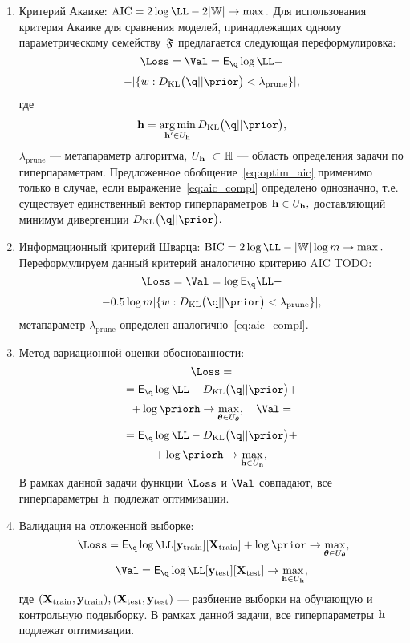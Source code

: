 \documentclass[11pt, a5paper]{dissert}
\theoremstyle{definition}
\DeclareMathOperator*{\argmin}{arg\,min}
\begin{document}
{\begin{enumerate}
\item Критерий Акаике:
$
   \text{AIC} =  2\log \LL - 2|\Wb| \to \max.
$
Для использования критерия Акаике для сравнения моделей, принадлежащих одному параметрическому семейству~$\mathfrak{F}$ предлагается следующая переформулировка:
\begin{equation}
\label{eq:optim_aic}
    \Loss = \Val = \E_{\q}\log \LL - 
\end{equation}
\[
 - |\{w: \KL{\q}{\prior}<\lambda_\text{prune}\}|,
\]
где 
\begin{equation}\label{eq:aic_compl}\h=\argmin_{\h' \in \Uh} \KL{\q}{\prior},\end{equation} $\lambda_{\text{prune}}$ --- метапараметр алгоритма, $\Uh  \subset \Hb$ --- область определения задачи по гиперпараметрам. Предложенное обобщение~\eqref{eq:optim_aic} применимо только в случае, если выражение~\eqref{eq:aic_compl} определено однозначно, т.е. существует единственный вектор гиперпараметров  $\mathbf{h} \in U_{\mathbf{h}},$ доставляющий минимум дивергенции $\KL{\q}{\prior}.$

\item Информационный критерий Шварца:
$
    \text{BIC} = 2\log \LL - |\Wb| \log m   \to \max.
$
Переформулируем данный критерий аналогично критерию AIC TODO:
\begin{equation}
\label{eq:optim_bic}
    \Loss = \Val = \log \E_{\q}\LL - 
\end{equation}
\[
 - 0.5 \log m |\{w: \KL{\q}{\prior}<\lambda_{\text{prune}}\}|,
\]
метапараметр $\lambda_{\text{prune}}$ определен аналогично~\eqref{eq:aic_compl}.

\item Метод вариационной оценки обоснованности:
\begin{equation}
\label{eq:optim_elbo_method}   
    \Loss = 
\end{equation}
\[
= \E_{\q} \log \LL - \KL{\q}{\prior} + 
\]
\[
+\log\priorh \to \max_{\teta \in \Uteta}, \quad    \Val = 
\]
\[
= \E_{\q} \log \LL - \KL{\q}{\prior} +
\]
\[+ \log\priorh \to \max_{\h \in \Uh},
\]
В рамках данной задачи функции $\Loss$ и $\Val$ совпадают, все гиперпараметры $\mathbf{h}$ подлежат оптимизации.

\item Валидация на отложенной выборке:
\begin{equation}
\label{eq:optim_hold_out}
    \Loss = \E_{\q} \log \LL[\y_\text{train}][\X_\text{train}] + \log \prior \to \max_{\teta \in \Uteta},
\end{equation}
\[
    \Val = \E_{\q} \log \LL[\y_\text{test}][\X_\text{test}] \to \max_{\h \in \Uh},
\]
где $(\mathbf{X}_\text{train}, \mathbf{y}_\text{train}), (\mathbf{X}_\text{test}, \mathbf{y}_\text{test})$ --- разбиение выборки на обучающую и контрольную подвыборку.
В рамках данной задачи, все гиперпараметры $\mathbf{h}$ подлежат оптимизации.


\end{enumerate}}
\end{document}
